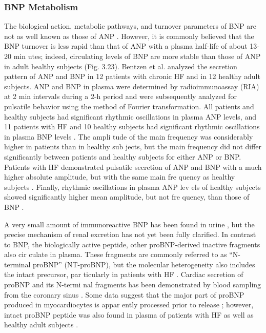\documentclass[14pt,a4paper,onecolumn]{extarticle}
\begin{document}
\subsubsection{BNP Metabolism}
The biological action, metabolic pathways, and turnover parameters of BNP are not as well known as those of ANP \citep{14}. However, it is commonly believed that the BNP turnover is less rapid than that of ANP with a plasma half-life of about 13-20 min utes; indeed, circulating levels of BNP are more stable than those of ANP in adult healthy subjects (Fig. 3.23). Bentzen et al. \citep{197} analyzed the secretion pattern of ANP and BNP in 12 patients with chronic HF and in 12 healthy adult subjects. ANP and BNP in plasma were determined by radioimmunoassay (RIA) at 2 min intervals during a 2-h period and were subsequently analyzed for pulsatile behavior using the method of Fourier transformation. All patients and healthy subjects had significant rhythmic oscillations in plasma ANP levels, and 11 patients with HF and 10 healthy subjects had significant rhythmic oscillations in plasma BNP levels \citep{197}. The ampli tude of the main frequency was considerably higher in patients than in healthy sub jects, but the main frequency did not differ significantly between patients and healthy subjects for either ANP or BNP. Patients with HF demonstrated pulsatile secretion of ANP and BNP with a much higher absolute amplitude, but with the same main fre quency as healthy subjects \citep{197}. Finally, rhythmic oscillations in plasma ANP lev els of healthy subjects showed significantly higher mean amplitude, but not fre quency, than those of BNP \citep{197}.

A very small amount of immunoreactive BNP has been found in urine \citep{202} \citep{203}, but the precise mechanism of renal excretion has not yet been fully clarified. In contrast to BNP, the biologically active peptide, other proBNP-derived inactive fragments also cir culate in plasma. These fragments are commonly referred to as “N-terminal proBNP” (NT-proBNP), but the molecular heterogeneity also includes the intact precursor, par ticularly in patients with HF \citep{14} \citep{204}. Cardiac secretion of proBNP and its N-termi nal fragments has been demonstrated by blood sampling from the coronary sinus \citep{205}.  Some data suggest that the major part of proBNP produced in myocardiocytes is appar ently processed prior to release \citep{14}; however, intact proBNP peptide was also found in plasma of patients with HF as well as healthy adult subjects \citep{14} \citep{205} \citep{206}.
\end{document}
